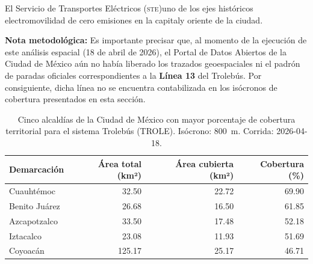 El \DIFaddbegin {}\DIFaddend Servicio de Transportes Eléctricos (\textsc{ste})\DIFdelbegin {}\DIFdelend \DIFaddbegin {}\DIFaddend uno de los ejes históricos \DIFdelbegin {}\DIFdelend \DIFaddbegin {}\DIFaddend electromovilidad de cero emisiones en la capital\DIFdelbegin {}\DIFdelend \DIFaddbegin {}\DIFaddend y oriente de la ciudad. \DIFaddbegin {}\DIFaddend 

\textbf{Nota metodológica:} Es importante precisar que, al momento de la
ejecución de este análisis espacial (18 de abril de 2026), el Portal de Datos
Abiertos de la Ciudad de México aún no había liberado los trazados geoespaciales
ni el padrón de paradas oficiales correspondientes a la \textbf{Línea 13} del
Trolebús. Por consiguiente, dicha línea no se encuentra contabilizada en los
isócronos de cobertura presentados en esta sección.

\DIFdelbegin {}%

\DIFdelend \begin{table}[H]
    \centering
    \caption[Alcaldías con mayor cobertura de Trolebús (CDMX)]{
    Cinco alcaldías de la Ciudad de México con mayor porcentaje de cobertura
    territorial para el sistema Trolebús (TROLE). Isócrono: 800~m.
    Corrida: 2026-04-18.}
    \label{tab:cobertura-trole-cdmx}
    \begin{tabular}{|l|r|r|r|}
        \hline
        \textbf{Demarcación} & \textbf{Área total (km²)} & \textbf{Área cubierta (km²)} & \textbf{Cobertura (\%)} \\
        \hline
        Cuauhtémoc    &  32.50 & 22.72 &  69.90 \\
        Benito Juárez &  26.68 & 16.50 &  61.85 \\
        Azcapotzalco  &  33.50 & 17.48 &  52.18 \\
        Iztacalco     &  23.08 & 11.93 &  51.69 \\
        Coyoacán      & 125.17 & 25.17 &  46.71 \\
        \hline
    \end{tabular}
\end{table}

